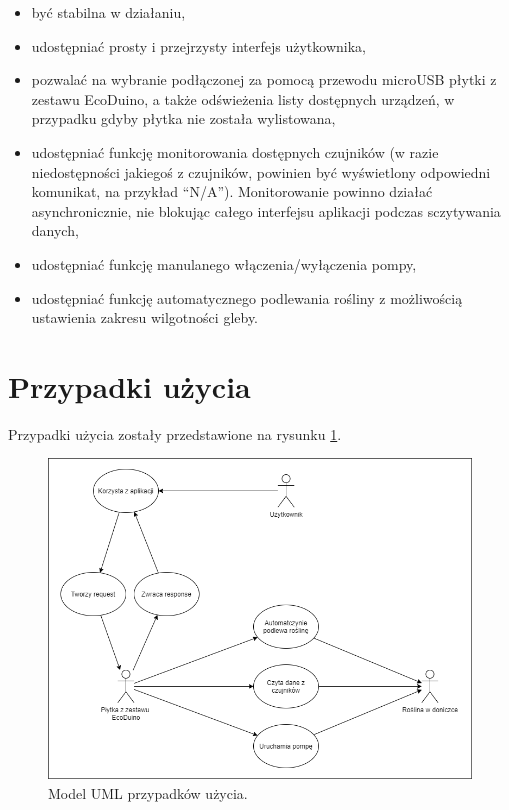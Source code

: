 \documentclass[a4paper,twoside,12pt]{book}
\begin{document}
\begin{itemize}
   \item być stabilna w działaniu,
   \item udostępniać prosty i przejrzysty interfejs użytkownika,
   \item pozwalać na wybranie podłączonej za pomocą przewodu microUSB płytki z zestawu EcoDuino, a także odświeżenia listy dostępnych urządzeń, w przypadku gdyby płytka nie została wylistowana,
   \item udostępniać funkcję monitorowania dostępnych czujników (w razie niedostępności jakiegoś z czujników, powinien być wyświetlony odpowiedni komunikat, na przykład ``N/A''). Monitorowanie powinno działać asynchronicznie, nie blokując całego interfejsu aplikacji podczas sczytywania danych,
   \item udostępniać funkcję manulanego włączenia/wyłączenia pompy,
   \item udostępniać funkcję automatycznego podlewania rośliny z możliwością ustawienia zakresu wilgotności gleby.
\end{itemize}

\section{Przypadki użycia}

Przypadki użycia zostały przedstawione na rysunku \ref{fig:1}.

\begin{figure}[H]
   \centering
   \includegraphics[width=\textwidth]{./assets/img/img001.png}
   \caption{Model UML przypadków użycia.}
   \label{fig:1}
\end{figure}
\end{document}

